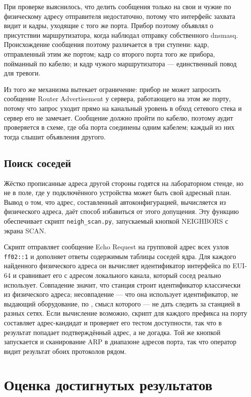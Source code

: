 При проверке выяснилось, что делить сообщения только на свои и чужие по физическому адресу отправителя недостаточно, потому что интерфейс захвата видит и кадры, уходящие с того же порта. Прибор поэтому объявлял о присутствии маршрутизатора, когда наблюдал отправку собственного dnsmasq. Происхождение сообщения поэтому различается в три ступени: кадр, отправленный этим же портом; кадр со второго порта того же прибора, пойманный по кабелю; и кадр чужого маршрутизатора — единственный повод для тревоги.

Из того же механизма вытекает ограничение: прибор не может запросить сообщение Router Advertisement у сервера, работающего на этом же порту, потому что запрос уходит прямо на канальный уровень в обход сетевого стека и сервер его не замечает. Сообщение должно пройти по кабелю, поэтому аудит проверяется в схеме, где оба порта соединены одним кабелем; каждый из них тогда слышит объявления другого.

\subsection{Поиск соседей}
\label{sec:vyhledavani_sousedu}

Жёстко прописанные адреса другой стороны годятся на лабораторном стенде, но не в поле, где у подключённого устройства может быть свой адресный план. Вывод о том, что адрес, составленный автоконфигурацией, вычисляется из физического адреса, даёт способ избавиться от этого допущения. Эту функцию обеспечивает скрипт \texttt{neigh\_scan.py}, запускаемый кнопкой NEIGHBORS с экрана SCAN.

Скрипт отправляет сообщение Echo Request на групповой адрес всех узлов \texttt{ff02::1} и дополняет ответы содержимым таблицы соседей ядра. Для каждого найденного физического адреса он вычисляет идентификатор интерфейса по EUI-64 и сравнивает его с адресом локального канала, который сосед реально использует. Совпадение значит, что станция строит идентификатор классически из физического адреса; несовпадение — что она использует идентификатор, не выдающий оборудование, по \cite{rfc7217}, смысл которого — не дать следить за станцией в разных сетях. Если вычисление возможно, скрипт для каждого префикса на порту составляет адрес-кандидат и проверяет его тестом доступности, так что в результат попадает подтверждённый адрес, а не догадка. Той же кнопкой запускается и сканирование ARP в диапазоне адресов порта, так что оператор видит результат обоих протоколов рядом.

\section{Оценка достигнутых результатов}
\label{sec:zhodnoceni}

